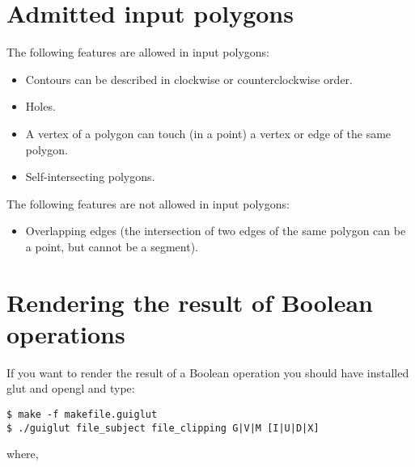 \documentclass[a4paper]{article}
\begin{document}
\section{Admitted input polygons}

The following features are allowed in input polygons:
\begin{itemize}
 \item Contours can be described in clockwise or counterclockwise order.
 \item Holes.
 \item A vertex of a polygon can touch (in a point) a vertex or edge of the same polygon.
 \item Self-intersecting polygons.
\end{itemize}

The following features are not allowed in input polygons:
\begin{itemize}
 \item Overlapping edges (the intersection of two edges of the same polygon can be a point, but cannot be a segment).
\end{itemize}

%
%

\section{Rendering the result of Boolean operations}

If you want to render the result of a Boolean operation you should have installed glut and opengl and type:

\begin{verbatim}
$ make -f makefile.guiglut
$ ./guiglut file_subject file_clipping G|V|M [I|U|D|X]
\end{verbatim}

\noindent where,
\end{document}
